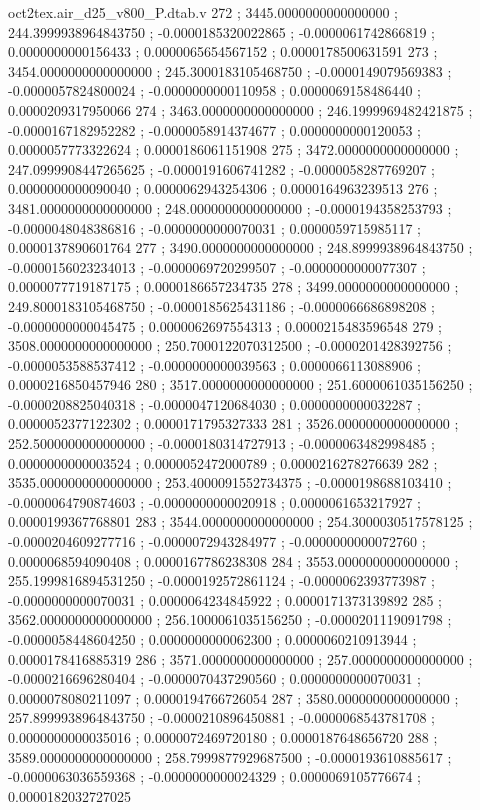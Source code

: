 \begin{filecontents}[overwrite]{oct2tex.air_d25_v800_P.dtab.v}
272 ; 3445.0000000000000000 ; 244.3999938964843750 ; -0.0000185320022865 ; -0.0000061742866819 ; 0.0000000000156433 ; 0.0000065654567152 ; 0.0000178500631591
273 ; 3454.0000000000000000 ; 245.3000183105468750 ; -0.0000149079569383 ; -0.0000057824800024 ; -0.0000000000110958 ; 0.0000069158486440 ; 0.0000209317950066
274 ; 3463.0000000000000000 ; 246.1999969482421875 ; -0.0000167182952282 ; -0.0000058914374677 ; 0.0000000000120053 ; 0.0000057773322624 ; 0.0000186061151908
275 ; 3472.0000000000000000 ; 247.0999908447265625 ; -0.0000191606741282 ; -0.0000058287769207 ; 0.0000000000090040 ; 0.0000062943254306 ; 0.0000164963239513
276 ; 3481.0000000000000000 ; 248.0000000000000000 ; -0.0000194358253793 ; -0.0000048048386816 ; -0.0000000000070031 ; 0.0000059715985117 ; 0.0000137890601764
277 ; 3490.0000000000000000 ; 248.8999938964843750 ; -0.0000156023234013 ; -0.0000069720299507 ; -0.0000000000077307 ; 0.0000077719187175 ; 0.0000186657234735
278 ; 3499.0000000000000000 ; 249.8000183105468750 ; -0.0000185625431186 ; -0.0000066686898208 ; -0.0000000000045475 ; 0.0000062697554313 ; 0.0000215483596548
279 ; 3508.0000000000000000 ; 250.7000122070312500 ; -0.0000201428392756 ; -0.0000053588537412 ; -0.0000000000039563 ; 0.0000066113088906 ; 0.0000216850457946
280 ; 3517.0000000000000000 ; 251.6000061035156250 ; -0.0000208825040318 ; -0.0000047120684030 ; 0.0000000000032287 ; 0.0000052377122302 ; 0.0000171795327333
281 ; 3526.0000000000000000 ; 252.5000000000000000 ; -0.0000180314727913 ; -0.0000063482998485 ; 0.0000000000003524 ; 0.0000052472000789 ; 0.0000216278276639
282 ; 3535.0000000000000000 ; 253.4000091552734375 ; -0.0000198688103410 ; -0.0000064790874603 ; -0.0000000000020918 ; 0.0000061653217927 ; 0.0000199367768801
283 ; 3544.0000000000000000 ; 254.3000030517578125 ; -0.0000204609277716 ; -0.0000072943284977 ; -0.0000000000072760 ; 0.0000068594090408 ; 0.0000167786238308
284 ; 3553.0000000000000000 ; 255.1999816894531250 ; -0.0000192572861124 ; -0.0000062393773987 ; -0.0000000000070031 ; 0.0000064234845922 ; 0.0000171373139892
285 ; 3562.0000000000000000 ; 256.1000061035156250 ; -0.0000201119091798 ; -0.0000058448604250 ; 0.0000000000062300 ; 0.0000060210913944 ; 0.0000178416885319
286 ; 3571.0000000000000000 ; 257.0000000000000000 ; -0.0000216696280404 ; -0.0000070437290560 ; 0.0000000000070031 ; 0.0000078080211097 ; 0.0000194766726054
287 ; 3580.0000000000000000 ; 257.8999938964843750 ; -0.0000210896450881 ; -0.0000068543781708 ; 0.0000000000035016 ; 0.0000072469720180 ; 0.0000187648656720
288 ; 3589.0000000000000000 ; 258.7999877929687500 ; -0.0000193610885617 ; -0.0000063036559368 ; -0.0000000000024329 ; 0.0000069105776674 ; 0.0000182032727025

\end{filecontents}
